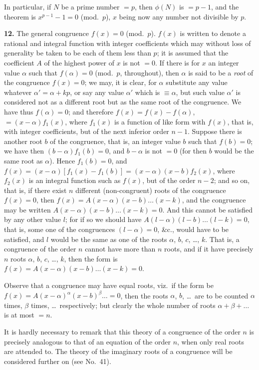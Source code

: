 \documentclass[11pt,a4paper]{article}
\theoremstyle{definition}
\begin{document}
In particular, if $N$ be a prime number $=p$, then $\phi(N)$ is $=p-1$, and the theorem is $x^{p-1}-1=0$ (mod.\ $p$), $x$ being now any number not divisible by $p$.

\textbf{12.} The general congruence $f(x)=0$ (mod.\ $p$). $f(x)$ is written to denote a rational and integral function with integer coefficients which may without loss of generality be taken to be each of them less than $p$; it is assumed that the coefficient $A$ of the highest power of $x$ is not $=0$. If there is for $x$ an integer value $\alpha$ such that $f(\alpha)=0$ (mod.\ $p$, throughout), then $\alpha$ is said to be a \textit{root} of the congruence $f(x)=0$; we may, it is clear, for $\alpha$ substitute any value whatever $\alpha'=\alpha+kp$, or say any value $\alpha'$ which is $\equiv\alpha$, but such value $\alpha'$ is considered not as a different root but as the same root of the congruence. We have thus $f(\alpha)=0$; and therefore $f(x)=f(x)-f(\alpha)$, $=(x-\alpha)f_1(x)$, where $f_1(x)$ is a function of like form with $f(x)$, that is, with integer coefficients, but of the next inferior order $n-1$. Suppose there is another root $b$ of the congruence, that is, an integer value $b$ such that $f(b)=0$; we have then $(b-\alpha)f_1(b)=0$, and $b-\alpha$ is not $=0$ (for then $b$ would be the same root as $\alpha$). Hence $f_1(b)=0$, and $f(x)=(x-\alpha)[f_1(x)-f_1(b)]=(x-\alpha)(x-b)f_2(x)$, where $f_2(x)$ is an integral function such as $f(x)$, but of the order $n-2$; and so on, that is, if there exist $n$ different (non-congruent) roots of the congruence $f(x)=0$, then $f(x)=A(x-\alpha)(x-b)\ldots(x-k)$, and the congruence may be written $A(x-\alpha)(x-b)\ldots(x-k)=0$. And this cannot be satisfied by any other value $l$; for if so we should have $A(l-\alpha)(l-b)\ldots(l-k)=0$, that is, some one of the congruences $(l-\alpha)=0$, \&c., would have to be satisfied, and $l$ would be the same as one of the roots $\alpha$, $b$, $c$, \ldots, $k$. That is, a congruence of the order $n$ cannot have more than $n$ roots, and if it have precisely $n$ roots $\alpha$, $b$, $c$, \ldots, $k$, then the form is $f(x)=A(x-\alpha)(x-b)\ldots(x-k)=0$.

Observe that a congruence may have equal roots, viz.\ if the form be $f(x)=A(x-\alpha)^\alpha(x-b)^\beta\ldots=0$, then the roots $\alpha$, $b$, \ldots\ are to be counted $\alpha$ times, $\beta$ times, \ldots\ respectively; but clearly the whole number of roots $\alpha+\beta+\ldots$ is at most $=n$.

It is hardly necessary to remark that this theory of a congruence of the order $n$ is precisely analogous to that of an equation of the order $n$, when only real roots are attended to. The theory of the imaginary roots of a congruence will be considered further on (see No.~41).
\end{document}
